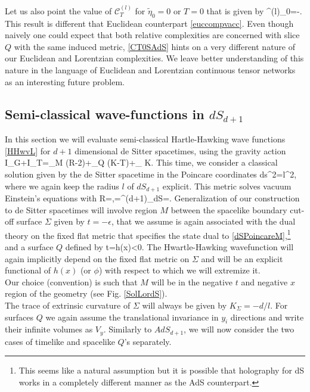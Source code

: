 \documentclass[a4paper,12pt]{article}
\begin{document}
Let us also point the value of $\mathcal{C}^{(l)}_T$ for $\tilde{\eta}_0=0$ or $T=0$ that is given by
\be
{}^{(l)}_0=-.\label{CT0SAdS}
\ee
This result is different that Euclidean counterpart \eqref{euccompvacc}. Even though naively one could expect that both  relative complexities are concerned with slice $Q$ with the same induced metric, \eqref{CT0SAdS} hints on a very different nature of our Euclidean and Lorentzian complexities. We leave better understanding of this nature in the language of Euclidean and Lorentzian continuous tensor networks as an interesting future problem.

\subsection{Semi-classical wave-functions in $dS_{d+1}$}
In this section we will evaluate semi-classical Hartle-Hawking wave functions \eqref{HHwvL} for 
$d+1$ dimensional de Sitter spacetimes, using the gravity action
\be
I_G+I_T=\int_{M} \left(R-2\Lambda\right)+\int_{Q} (K-T)+\int_{\Sigma} K.\label{ActLdS}
\ee
This time, we consider a classical solution given by the de Sitter spacetime in the Poincare coordinates
\be
ds^2=l^2,\label{dSPoincareM}
\ee
where we again keep the radius $l$ of $dS_{d+1}$ explicit.  This metric solves vacuum Einstein's equations with
\be
R=,\qquad \Lambda=\Lambda^{(d+1)}_{dS}=.
\ee 
Generalization of our construction to de Sitter spacetimes will involve region $M$ between the spacelike boundary cut-off surface $\Sigma$ given by $t=-\epsilon$, that we assume is again associated with the dual theory on the fixed flat metric that specifies the state dual to \eqref{dSPoincareM},\footnote{This seems like a natural assumption but it is possible that holography for dS works in a completely different manner as the AdS counterpart.} and a surface $Q$ defined by
 \be
 t=h(x)<0.
 \ee
The Hwartle-Hawking wavefunction will again implicitly depend on the fixed flat metric on $\Sigma$ and will be an explicit functional of $h(x)$ (or $\phi$) with respect to which we will extremize it.\\ 
 Our choice (convention) is such that $M$ will be in the negative $t$ and negative $x$ region of the geometry (see Fig. \ref{SolLordS}).\\ 
The trace of extrinsic curvature of $\Sigma$ will always be given by $K_\Sigma=-d/l$. For surfaces $Q$ we again assume the translational invariance in $y_i$ directions and write their infinite volumes as $V_y$. Similarly to $AdS_{d+1}$, we will now consider the two cases of timelike and spacelike $Q$'s separately.   
\end{document}
